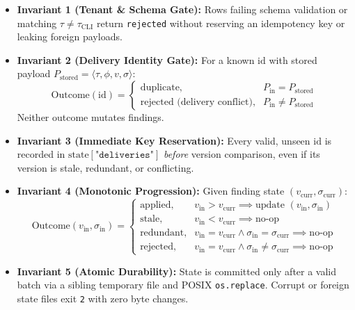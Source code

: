 \documentclass[10pt,a4paper]{article}
\begin{document}
\begin{itemize}[leftmargin=1.5em, noitemsep, topsep=2pt]
    \item \textbf{Invariant 1 (Tenant \& Schema Gate):} Rows failing schema validation or matching $\tau \neq \tau_{\text{CLI}}$ return \texttt{rejected} without reserving an idempotency key or leaking foreign payloads.
    \item \textbf{Invariant 2 (Delivery Identity Gate):} For a known $\text{id}$ with stored payload $P_{\text{stored}} = \langle \tau, \phi, v, \sigma \rangle$:
    \begin{equation}
    \text{Outcome}(\text{id}) = \begin{cases}
    \text{duplicate}, & P_{\text{in}} = P_{\text{stored}} \\
    \text{rejected (delivery conflict)}, & P_{\text{in}} \neq P_{\text{stored}}
    \end{cases}
    \end{equation}
    Neither outcome mutates findings.
    \item \textbf{Invariant 3 (Immediate Key Reservation):} Every valid, unseen $\text{id}$ is recorded in $\text{state}[\texttt{"deliveries"}]$ \textit{before} version comparison, even if its version is stale, redundant, or conflicting.
    \item \textbf{Invariant 4 (Monotonic Progression):} Given finding state $(v_{\text{curr}}, \sigma_{\text{curr}})$:
    \begin{equation}
    \text{Outcome}(v_{\text{in}}, \sigma_{\text{in}}) = \begin{cases}
    \text{applied}, & v_{\text{in}} > v_{\text{curr}} \implies \text{update } (v_{\text{in}}, \sigma_{\text{in}}) \\
    \text{stale}, & v_{\text{in}} < v_{\text{curr}} \implies \text{no-op} \\
    \text{redundant}, & v_{\text{in}} = v_{\text{curr}} \land \sigma_{\text{in}} = \sigma_{\text{curr}} \implies \text{no-op} \\
    \text{rejected}, & v_{\text{in}} = v_{\text{curr}} \land \sigma_{\text{in}} \neq \sigma_{\text{curr}} \implies \text{no-op}
    \end{cases}
    \end{equation}
    \item \textbf{Invariant 5 (Atomic Durability):} State is committed only after a valid batch via a sibling temporary file and POSIX \texttt{os.replace}. Corrupt or foreign state files exit \texttt{2} with zero byte changes.
\end{itemize}
\end{document}
